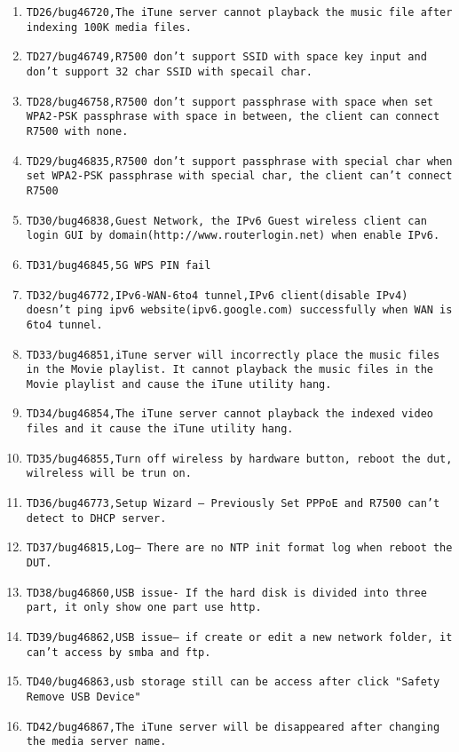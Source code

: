 \documentclass[12pt]{report}
\begin{document}
\begin{itemize}
\begin{enumerate}
		\item \texttt{TD26/bug46720,The iTune server cannot playback the music file after indexing 100K media files.}
		\item \texttt{TD27/bug46749,R7500 don't support SSID with space key input and don't support 32 char SSID with specail char.}
		\item \texttt{TD28/bug46758,R7500 don't support passphrase with space  when set WPA2-PSK passphrase with space in between, the client can connect R7500 with none.}
		\item \texttt{TD29/bug46835,R7500 don't support passphrase with special char when set WPA2-PSK passphrase with special char, the client can't connect R7500}
		\item \texttt{TD30/bug46838,Guest Network, the IPv6 Guest wireless client can login GUI by domain(http://www.routerlogin.net) when enable IPv6.}
		\item \texttt{TD31/bug46845,5G WPS PIN fail}
		\item \texttt{TD32/bug46772,IPv6-WAN-6to4 tunnel,IPv6 client(disable IPv4) doesn't ping ipv6 website(ipv6.google.com) successfully when WAN is 6to4 tunnel.}
		\item \texttt{TD33/bug46851,iTune server will incorrectly place the music files in the Movie playlist. It cannot playback the music files in the Movie playlist  and cause the iTune utility hang.}
		\item \texttt{TD34/bug46854,The iTune server cannot playback the indexed video files and it cause the iTune utility hang.}
		\item \texttt{TD35/bug46855,Turn off wireless by hardware button, reboot the dut, wilreless will be trun on.}
		\item \texttt{TD36/bug46773,Setup Wizard -- Previously Set PPPoE and R7500 can't detect to DHCP server.}
		\item \texttt{TD37/bug46815,Log-- There are no NTP init format log when reboot the DUT.}
		\item \texttt{TD38/bug46860,USB issue- If the hard disk is divided into three part, it only show one part use http.}
		\item \texttt{TD39/bug46862,USB issue-- if create or edit a new network folder, it can't access by smba and ftp.}
		\item \texttt{TD40/bug46863,usb storage still can be access after click "Safety Remove USB Device"}
		\item \texttt{TD42/bug46867,The iTune server will be disappeared after changing the media server name.}

\end{enumerate}
\end{itemize}
\end{document}
